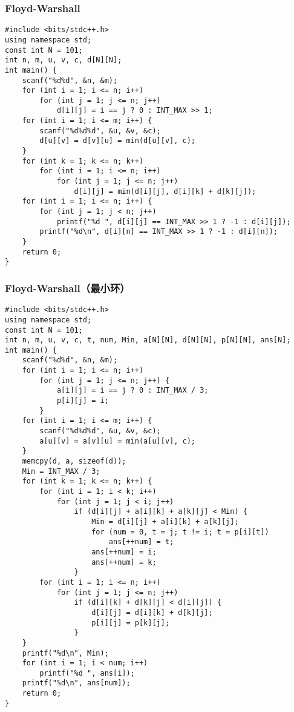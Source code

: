 ﻿\documentclass[a4paper]{article}
\begin{document}
\subsubsection{Floyd-Warshall}
\begin{lstlisting}
#include <bits/stdc++.h>
using namespace std;
const int N = 101;
int n, m, u, v, c, d[N][N];
int main() {
    scanf("%d%d", &n, &m);
    for (int i = 1; i <= n; i++)
        for (int j = 1; j <= n; j++)
            d[i][j] = i == j ? 0 : INT_MAX >> 1;
    for (int i = 1; i <= m; i++) {
        scanf("%d%d%d", &u, &v, &c);
        d[u][v] = d[v][u] = min(d[u][v], c);
    }
    for (int k = 1; k <= n; k++)
        for (int i = 1; i <= n; i++)
            for (int j = 1; j <= n; j++)
                d[i][j] = min(d[i][j], d[i][k] + d[k][j]);
    for (int i = 1; i <= n; i++) {
        for (int j = 1; j < n; j++)
            printf("%d ", d[i][j] == INT_MAX >> 1 ? -1 : d[i][j]);
        printf("%d\n", d[i][n] == INT_MAX >> 1 ? -1 : d[i][n]);
    }
    return 0;
}
\end{lstlisting}
\subsubsection{Floyd-Warshall（最小环）}
\begin{lstlisting}
#include <bits/stdc++.h>
using namespace std;
const int N = 101;
int n, m, u, v, c, t, num, Min, a[N][N], d[N][N], p[N][N], ans[N];
int main() {
    scanf("%d%d", &n, &m);
    for (int i = 1; i <= n; i++)
        for (int j = 1; j <= n; j++) {
            a[i][j] = i == j ? 0 : INT_MAX / 3;
            p[i][j] = i;
        }
    for (int i = 1; i <= m; i++) {
        scanf("%d%d%d", &u, &v, &c);
        a[u][v] = a[v][u] = min(a[u][v], c);
    }
    memcpy(d, a, sizeof(d));
    Min = INT_MAX / 3;
    for (int k = 1; k <= n; k++) {
        for (int i = 1; i < k; i++)
            for (int j = 1; j < i; j++)
                if (d[i][j] + a[i][k] + a[k][j] < Min) {
                    Min = d[i][j] + a[i][k] + a[k][j];
                    for (num = 0, t = j; t != i; t = p[i][t])
                        ans[++num] = t;
                    ans[++num] = i;
                    ans[++num] = k;
                }
        for (int i = 1; i <= n; i++)
            for (int j = 1; j <= n; j++)
                if (d[i][k] + d[k][j] < d[i][j]) {
                    d[i][j] = d[i][k] + d[k][j];
                    p[i][j] = p[k][j];
                }
    }
    printf("%d\n", Min);
    for (int i = 1; i < num; i++)
        printf("%d ", ans[i]);
    printf("%d\n", ans[num]);
    return 0;
}
\end{lstlisting}
\end{document}
